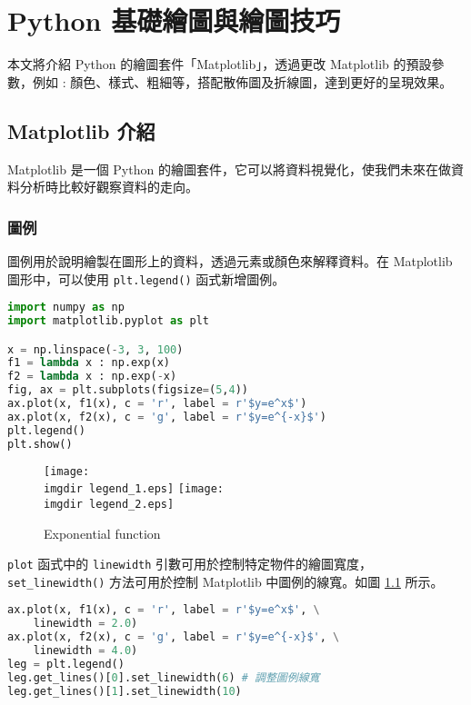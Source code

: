 %   
%

\chapter{Python 基礎繪圖與繪圖技巧}
本文將介紹 Python 的繪圖套件「Matplotlib」，透過更改 Matplotlib 的預設參數，例如 : 顏色、樣式、粗細等，搭配散佈圖及折線圖，達到更好的呈現效果。

\section{Matplotlib 介紹}
Matplotlib 是一個 Python 的繪圖套件，它可以將資料視覺化，使我們未來在做資料分析時比較好觀察資料的走向。
\subsection{圖例}

圖例用於說明繪製在圖形上的資料，透過元素或顏色來解釋資料。在 Matplotlib 圖形中，可以使用 \verb|plt.legend()| 函式新增圖例。
\bigskip
\begin{lstlisting}[language = Python]
import numpy as np
import matplotlib.pyplot as plt

x = np.linspace(-3, 3, 100)
f1 = lambda x : np.exp(x)
f2 = lambda x : np.exp(-x)
fig, ax = plt.subplots(figsize=(5,4))
ax.plot(x, f1(x), c = 'r', label = r'$y=e^x$')
ax.plot(x, f2(x), c = 'g', label = r'$y=e^{-x}$')
plt.legend()
plt.show()
\end{lstlisting}
\begin{figure}[H]
\centering
\texttt{[image: \\imgdir legend\_1.eps]}
\texttt{[image: \\imgdir legend\_2.eps]}
\caption{Exponential function}
\label{fig:legend}
\end{figure}

\verb|plot| 函式中的 \verb|linewidth| 引數可用於控制特定物件的繪圖寬度，\verb|set_linewidth()| 方法可用於控制 Matplotlib 中圖例的線寬。如圖 \ref{fig:legend} 所示。
\bigskip
\begin{lstlisting}[language = Python]
ax.plot(x, f1(x), c = 'r', label = r'$y=e^x$', \
	linewidth = 2.0) 
ax.plot(x, f2(x), c = 'g', label = r'$y=e^{-x}$', \
	linewidth = 4.0)
leg = plt.legend()
leg.get_lines()[0].set_linewidth(6) # 調整圖例線寬
leg.get_lines()[1].set_linewidth(10)
\end{lstlisting}

